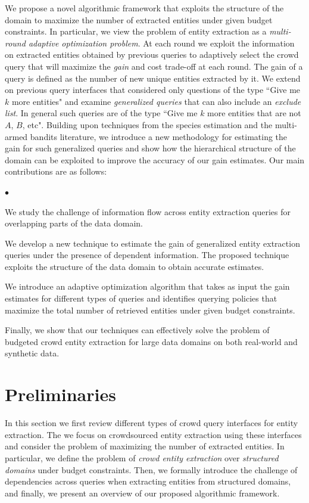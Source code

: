 \documentclass{vldb}
\newcommand{\squishlist}{
   \begin{list}{$\bullet$}
    {
      \setlength{\itemsep}{0pt}
      \setlength{\parsep}{3pt}
      \setlength{\topsep}{3pt}
      \setlength{\partopsep}{0pt}
      \setlength{\leftmargin}{1.5em}
      \setlength{\labelwidth}{1em}
      \setlength{\labelsep}{0.5em} } }
\newcommand{\squishend}{
    \end{list}  }
\begin{document}
We propose a novel algorithmic framework that exploits the structure of the domain to maximize the number of extracted entities under given budget constraints. In particular, we view the problem of entity extraction as a {\em multi-round adaptive optimization problem}. At  each round we exploit the information on extracted entities obtained by previous queries to adaptively select the crowd query that will maximize the {\em gain} and cost trade-off at each round. The gain of a query is defined as the number of new unique entities extracted by it. We extend on previous query interfaces that considered only questions of the type ``Give me $k$ more entities" and examine {\em generalized queries} that can also include an {\em exclude list}. In general such queries are of the type ``Give me $k$ more entities that are not $A$, $B$, etc". Building upon techniques from the species estimation and the multi-armed bandits literature, we introduce a new methodology for estimating the gain for such generalized queries and show how the hierarchical structure of the domain can be exploited to improve the accuracy of our gain estimates. Our main contributions are as follows:

\squishlist
\item We study the challenge of information flow across entity extraction queries for overlapping parts of the data domain.
\item We develop a new technique to estimate the gain of generalized entity extraction queries under the presence of dependent information. The proposed technique exploits the structure of the data domain to obtain accurate estimates. 
\item We introduce an adaptive optimization algorithm that takes as input the gain estimates for different types of queries and identifies querying policies that maximize the total number of retrieved entities under given budget constraints. 
\item Finally, we show that our techniques can effectively solve the problem of budgeted crowd entity extraction for large data domains on both real-world and synthetic data.
\squishend

\section{Preliminaries}
\label{sec:prelims}
In this section we first review different types of crowd query interfaces for entity extraction. The we focus on crowdsourced entity extraction using these interfaces and consider the problem of maximizing the number of extracted entities. In particular, we define the problem of {\em crowd entity extraction} over {\em structured domains} under budget constraints. Then, we formally introduce the challenge of dependencies across queries when extracting entities from structured domains, and finally, we present an overview of our proposed algorithmic framework.
\end{document}
